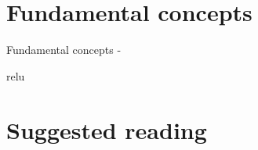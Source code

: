 \section{Fundamental concepts}
\begin{frame}[t,allowframebreaks]{Fundamental concepts - }

    \gls{relu}
\end{frame}




\renewcommand{\partsummarytitle}{Main points to remember }




\section{Suggested reading}




